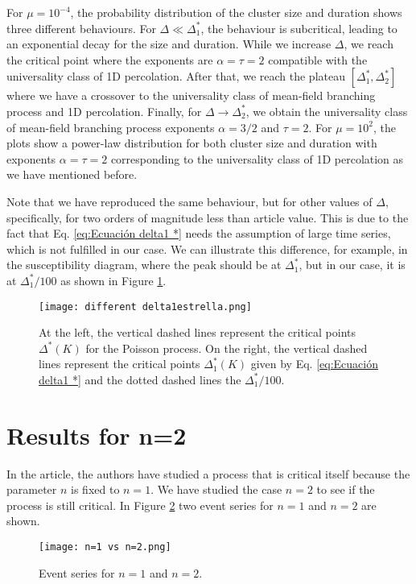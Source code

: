 For $\mu=10^{-4}$, the probability distribution of the cluster size and duration shows three different behaviours. For $\Delta\ll\Delta_1^*$, the behaviour is subcritical, leading to
an exponential decay for the size and duration. While we increase $\Delta$, we reach the critical point where the exponents are $\alpha=\tau=2$ compatible with the universality class
of 1D percolation. After that, we reach the plateau $[\Delta_1^*,\Delta_2^*]$ where we have a crossover to the universality class of mean-field branching process and 1D percolation. 
Finally, for $\Delta\to\Delta_2^*$, we obtain the universality class of mean-field branching process exponents $\alpha=3/2$ and $\tau=2$. 
For $\mu=10^2$, the plots show a power-law distribution for both cluster size and duration with exponents $\alpha=\tau=2$ corresponding to the universality class of 1D percolation as we have
mentioned before.

Note that we have reproduced the same behaviour, but for other values of $\Delta$, specifically, for two orders of magnitude less than article value. This is due 
to the fact that Eq. \ref{eq:Ecuación delta1 *} needs the assumption of large time series, which is not fulfilled in our case. We can illustrate this difference,
for example, in the susceptibility diagram, where the peak should be at $\Delta_1^*$, but in our case, it is at $\Delta_1^*/100$ as shown in Figure \ref{f:different delta1estrella}. 

\begin{figure}[H]
\centering
\texttt{[image: different delta1estrella.png]}
\caption{At the left, the vertical dashed lines represent the critical points $\Delta^*(K)$ for the Poisson process. On the right, the vertical dashed lines represent 
the critical points $\Delta_1^*(K)$ given by Eq. \ref{eq:Ecuación delta1 *} and the dotted dashed lines the $\Delta_1^*/100$.} 
\label{f:different delta1estrella}
\end{figure}


\section{Results for n=2}

In the article, the authors have studied a process that is critical itself because the parameter $n$ is fixed to $n=1$. We have studied the case $n=2$ to see if the process is still critical. 
In Figure \ref{f:n=1 vs n=2} two event series for $n=1$ and $n=2$ are shown. 

\begin{figure}[H]
    \centering
    \texttt{[image: n=1 vs n=2.png]}
    \caption{Event series for $n=1$ and $n=2$.}
    \label{f:n=1 vs n=2}
\end{figure}

